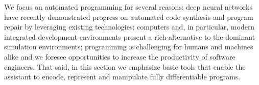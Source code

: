 


We focus on automated programming for several reasons: deep neural networks have recently demonstrated progress on automated code synthesis and program repair by leveraging existing technologies; computers and, in particular, modern integrated development environments present a rich alternative to the dominant simulation environments; programming is challenging for humans and machines alike and we foresee opportunities to increase the productivity of software engineers. That said, in this section we emphasize basic tools that enable the assistant to encode, represent and manipulate fully differentiable programs.







